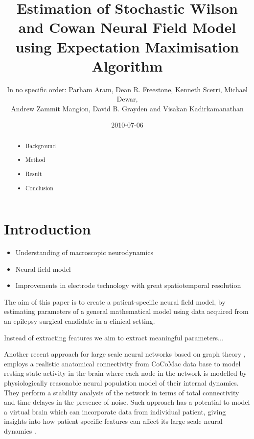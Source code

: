 \documentclass[]{article}
\title{Estimation of Stochastic Wilson and Cowan Neural Field Model using Expectation Maximisation Algorithm}
\author{In no specific order: Parham Aram, Dean R. Freestone, Kenneth Scerri, Michael Dewar,\\
 Andrew Zammit Mangion, David B. Grayden and Visakan Kadirkamanathan  }
\date{2010-07-06}
\newif\ifpdf
\begin{document}
\ifpdf
\DeclareGraphicsExtensions{.pdf, .jpg, .tif}
\else
{}
\fi

\maketitle


\begin{abstract}
	
	\begin{itemize}
		\item Background
		\item Method
		\item Result
		\item Conclusion
	\end{itemize}
\end{abstract}

\section{Introduction}
\begin{itemize}
	\item Understanding of macroscopic neurodynamics
	\item Neural field model
	\item Improvements in electrode technology with great spatiotemporal resolution


\end{itemize}
The aim of this paper is to create a patient-specific neural field model, by estimating parameters of a general mathematical model using data acquired from an epilepsy surgical candidate in a clinical setting. 

Instead of extracting features we aim to extract meaningful parameters...


Another recent approach for large scale neural networks based on graph theory \cite{Albert2002,Bang-Jensen2010}, employs a realistic anatomical connectivity from CoCoMac data base \cite{Kotter2004} to model resting state activity in the brain \cite{Ghosh2008,Deco2009} where each node in the network is modelled by physiologically reasonable neural population model of their internal dynamics. They perform a stability analysis of the network in terms of total connectivity and time delayes in the presence of noise. Such approach has a potential to model a virtual brain which can incorporate data from individual patient, giving insights into how patient specific features can affect its large scale neural dynamics \cite{Jirsa2010,Deco2010}.
\end{document}
